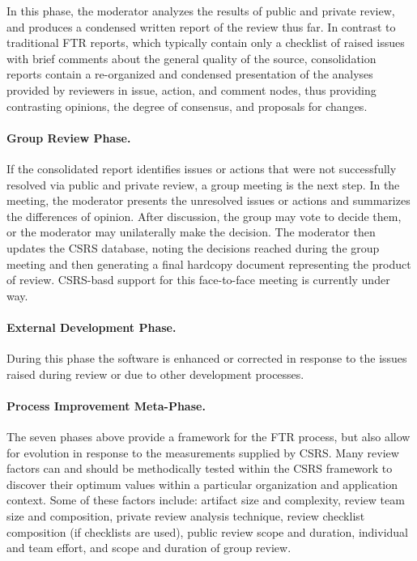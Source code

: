 In this phase, the moderator analyzes the results of public and
private review, and produces a condensed written report of the review
thus far.  In contrast to traditional FTR reports, which typically
contain only a checklist of raised issues with brief comments about
the general quality of the source, consolidation reports contain a
re-organized and condensed presentation of the analyses provided by
reviewers in issue, action, and comment nodes, thus providing
contrasting opinions, the degree of consensus, and proposals for
changes.

\paragraph {Group Review Phase.} 

If the consolidated report identifies issues or actions that were not
successfully resolved via public and private review, a group meeting
is the next step.  In the meeting, the moderator presents the
unresolved issues or actions and summarizes the differences of
opinion.  After discussion, the group may vote to decide them, or the
moderator may unilaterally make the decision. The moderator then
updates the CSRS database, noting the decisions reached during the
group meeting and then generating a final hardcopy document
representing the product of review.  CSRS-basd support for this 
face-to-face meeting is currently under way.

\paragraph{External Development Phase.}  

During this phase the software is enhanced or corrected in response to
the issues raised during review or due to other development processes.

\paragraph{Process Improvement Meta-Phase.}

The seven phases above provide a framework for the FTR process, but
also allow for evolution in response to the measurements supplied
by CSRS.  Many review factors can and should be methodically tested
within the CSRS framework to discover their optimum values within
a particular organization and application context.  Some of these
factors include: artifact size and complexity, review team size
and composition, private review analysis technique, review checklist
composition (if checklists are used), public review scope and
duration, individual and team effort, and scope and duration of 
group review. 


